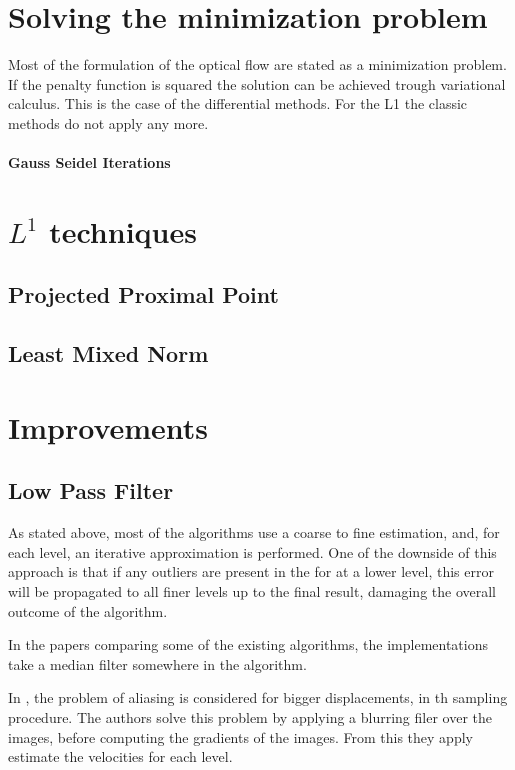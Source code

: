 \documentclass[12pt,a4paper,twoside]{report}
\begin{document}
\section{Solving the minimization problem}
Most of the formulation of the optical flow are stated as a minimization problem. If the penalty function is squared the solution can be achieved trough variational calculus. This is the case of the differential methods. For the L1 the classic methods do not apply  any more.
\paragraph{Gauss Seidel Iterations}

\section{$L^1$ techniques}
\subsection{Projected Proximal Point}


\subsection{Least Mixed Norm}

\section{Improvements}
\subsection{Low Pass Filter}

As stated above, most of the algorithms use a coarse to fine estimation, and, for each level, an iterative approximation is performed.
One of the downside of this approach is that if any outliers are present in the for at a lower level, this error will be propagated to all finer levels up to the final result, damaging the overall outcome of the algorithm.

In the papers comparing some of the existing algorithms, the implementations take a median filter somewhere in the algorithm.

In \cite{fleet2006}, the problem of aliasing is considered for bigger displacements, in th sampling procedure. The authors solve this problem by applying a blurring filer over the images, before computing the gradients of the images. From this they apply estimate the velocities for each level.
\end{document}
